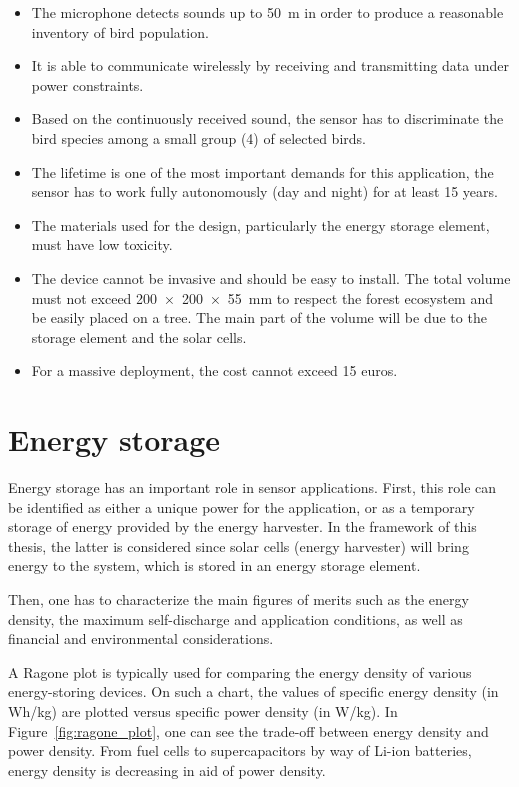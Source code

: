 \documentclass{EPL-master-thesis-covers-EN}
\begin{document}
\begin{itemize}
 \item The microphone detects sounds up to \SI{50}{m} in order to produce a reasonable inventory of bird population.
 \item It is able to communicate wirelessly by receiving and transmitting data under power constraints.
 \item Based on the continuously received sound, the sensor has to discriminate the bird species among a small group (4) of selected birds.
 \item The lifetime is one of the most important demands for this application, the sensor has to work fully autonomously (day and night) for at least 15 years.
 \item The materials used for the design, particularly the energy storage element, must have low toxicity.
 \item The device cannot be invasive and should be easy to install. The total volume must not exceed \SI{200 x 200 x 55}{mm} to respect the forest ecosystem and be easily placed on a tree. The main part of the volume will be due to the storage element and the solar cells.
 \item For a massive deployment, the cost cannot exceed 15 euros.
\end{itemize}



\chapter{Energy storage}

Energy storage has an important role in sensor applications. First, this role can be identified as either a unique power for the application, or as a temporary storage of energy provided by the energy harvester. In the framework of this thesis, the latter is considered since solar cells (energy harvester) will bring energy to the system, which is stored in an energy storage element.

Then, one has to characterize the main figures of merits such as the energy density, the maximum self-discharge and application conditions, as well as financial and environmental considerations.

A Ragone plot is typically used for comparing the energy density of various energy-storing devices. On such a chart, the values of specific energy density (in \si{Wh/kg}) are plotted versus specific power density (in \si{W/kg}). In Figure~\ref{fig:ragone_plot}, one can see the trade-off between energy density and power density. From fuel cells to supercapacitors by way of Li-ion batteries, energy density is decreasing in aid of power density.
\end{document}
